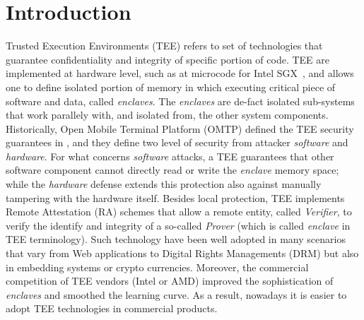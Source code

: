 \chapter{Introduction} %
\label{chp:introduction} 

Trusted Execution Environments (TEE) refers to set of technologies that 
guarantee confidentiality and integrity of specific portion of code.
TEE are implemented at hardware level, such as at microcode for Intel 
SGX~, and allows one to define isolated portion of memory in which 
executing critical piece of software and data, called \emph{enclaves}.
The \emph{enclaves} are de-fact isolated sub-systems that work parallely with, 
and isolated from, the other system components.
Historically, Open Mobile Terminal Platform (OMTP) defined the TEE security 
guarantees in , and they define two level of security from attacker 
\emph{software} and \emph{hardware}.
For what concerns \emph{software} attacks, a TEE guarantees that other software 
component cannot directly read or write the \emph{enclave} memory space;
while the \emph{hardware} defense extends this protection also against manually 
tampering with the hardware itself.
Besides local protection, TEE implements Remote Attestation (RA) schemes
that allow a remote entity, called \emph{Verifier}, to verify the identify and 
integrity of a so-called \emph{Prover} (which is called \emph{enclave} in TEE 
terminology).
Such technology have been well adopted in many scenarios that vary from Web 
applications to Digital Rights Managements (DRM) but also in embedding systems 
or crypto currencies.
Moreover, the commercial competition of TEE vendors (\eg Intel or AMD) improved 
the sophistication of \emph{enclaves} and smoothed the learning curve.
As a result, nowadays it is easier to adopt TEE technologies in commercial 
products.

